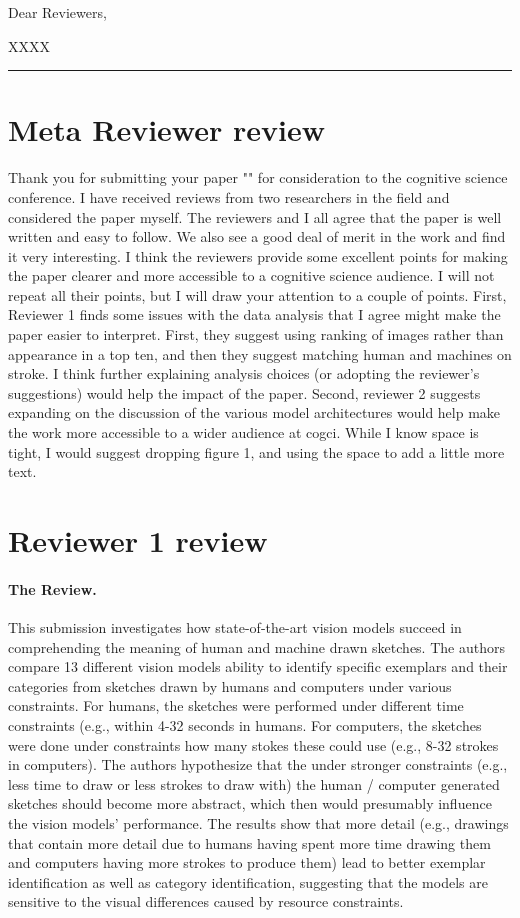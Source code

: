 \documentclass[10pt,letterpaper]{article}
\begin{document}
Dear Reviewers,

XXXX\\

\hrule


\section*{Meta Reviewer review}

Thank you for submitting your paper "" for consideration to the cognitive science conference. 
I have received reviews from two researchers in the field and considered the paper myself. 
The reviewers and I all agree that the paper is well  written and easy to follow. 
We also see a good deal of merit in the work and find it very interesting. 
I think the reviewers provide some excellent points for making the paper clearer and more accessible to a cognitive science audience. I will not repeat all their points, but I will draw your attention to a couple of points. 
First, Reviewer 1 finds some issues with the data analysis that I agree might make the paper easier to interpret. 
First, they suggest using ranking of images rather than appearance in a top ten, and then they suggest matching human and machines on stroke. 
I think further explaining analysis choices (or adopting the reviewer's suggestions) would help the impact of the paper. 
Second, reviewer 2 suggests expanding on the discussion of the various model architectures would help make the work more accessible to a wider audience at cogci. 
While I know space is  tight, I would suggest dropping figure 1, and using the space to add a little more text.

\section*{Reviewer 1 review}

\paragraph{The Review.}

   This submission investigates how state-of-the-art vision models succeed in comprehending the meaning of human and machine drawn sketches. 
   The authors compare 13 different vision models ability to identify specific exemplars and their categories from sketches drawn by humans and computers under various constraints.
   For humans, the sketches were performed under different time constraints (e.g., within 4-32 seconds in humans. 
   For computers, the sketches were done under constraints how many stokes these could use (e.g., 8-32 strokes in computers). 
   The authors hypothesize that the under stronger constraints (e.g., less time to draw or less strokes to draw with) the human / computer generated sketches should become more abstract, which then would presumably influence the vision models’ performance. 
   The results show that more detail (e.g., drawings that contain more detail due to humans having spent more time drawing them and computers having more strokes to produce them) lead to better exemplar identification as well as category identification, suggesting that the models are sensitive to the visual differences caused by resource constraints.
\end{document}

